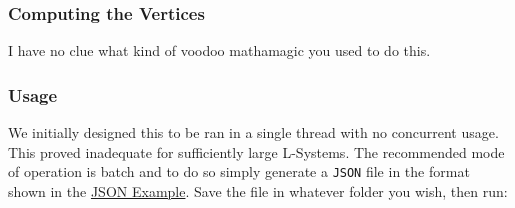 
\subsubsection{Computing the Vertices}
I have no clue what kind of voodoo mathamagic you used to do this.




\subsubsection{Usage}
We initially designed this to be ran in a single thread with no concurrent
usage. This proved inadequate for sufficiently large L-Systems. The recommended
mode of operation is batch and to do so simply generate a \texttt{JSON} file in
the format shown in the \hyperref[code:prob1_json]{JSON Example}. Save the file
in whatever folder you wish, then run:

